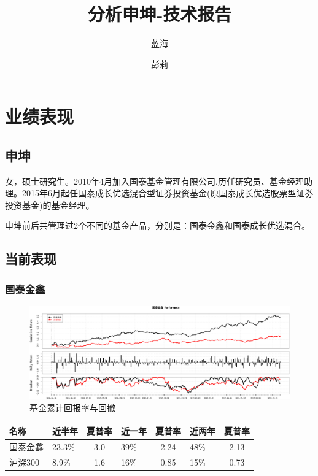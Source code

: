 \documentclass[hyperref,]{ctexart}
\title{分析申坤-技术报告}
\author{蓝海 \and 彭莉}
\date{}
\begin{document}
\maketitle

{
\setcounter{tocdepth}{2}
\tableofcontents
}
\section{业绩表现}

\subsection{申坤}

女，硕士研究生。2010年4月加入国泰基金管理有限公司,历任研究员、基金经理助理。2015年6月起任国泰成长优选混合型证券投资基金(原国泰成长优选股票型证券投资基金)的基金经理。

申坤前后共管理过2个不同的基金产品，分别是：国泰金鑫和国泰成长优选混合。

\subsection{当前表现}

\subsubsection{国泰金鑫}

\begin{figure}[htbp]
\centering
\includegraphics{shenkun-details_files/figure-latex/unnamed-chunk-2-1.pdf}
\caption{基金累计回报率与回撤}
\end{figure}

\begin{longtable}[]{@{}llclclc@{}}
\toprule
名称 & 近半年 & 夏普率 & 近一年 & 夏普率 & 近两年 &
夏普率\tabularnewline
\midrule
\endhead
国泰金鑫 & 23.3\% & 3.0 & 39\% & 2.24 & 48\% & 2.13\tabularnewline
沪深300 & 8.9\% & 1.6 & 16\% & 0.85 & 15\% & 0.73\tabularnewline
\bottomrule
\end{longtable}
\end{document}
